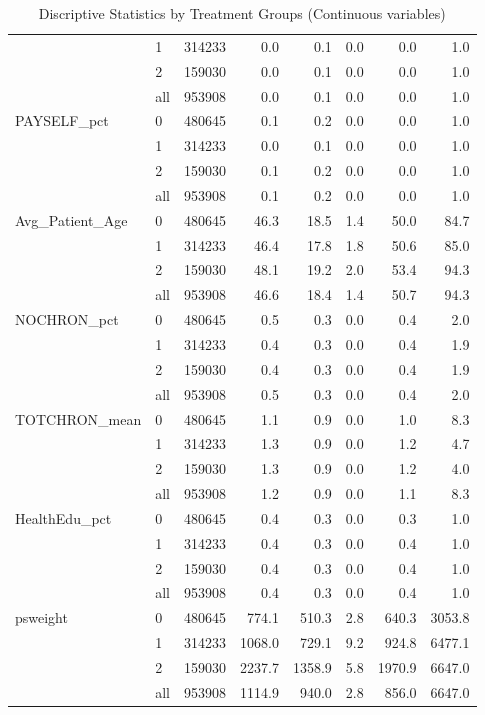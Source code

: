 \begin{table}[ht]
{\begin{tabular}{llrrrrrr}
   & 1 & 314233 &    0.0 &    0.1 & 0.0 &    0.0 &    1.0 \\ 
   & 2 & 159030 &    0.0 &    0.1 & 0.0 &    0.0 &    1.0 \\ 
   \hline
 & all & 953908 &    0.0 &    0.1 & 0.0 &    0.0 &    1.0 \\ 
   \hline
PAYSELF\_pct & 0 & 480645 &    0.1 &    0.2 & 0.0 &    0.0 &    1.0 \\ 
   & 1 & 314233 &    0.0 &    0.1 & 0.0 &    0.0 &    1.0 \\ 
   & 2 & 159030 &    0.1 &    0.2 & 0.0 &    0.0 &    1.0 \\ 
   \hline
 & all & 953908 &    0.1 &    0.2 & 0.0 &    0.0 &    1.0 \\ 
   \hline
Avg\_Patient\_Age & 0 & 480645 &   46.3 &   18.5 & 1.4 &   50.0 &   84.7 \\ 
   & 1 & 314233 &   46.4 &   17.8 & 1.8 &   50.6 &   85.0 \\ 
   & 2 & 159030 &   48.1 &   19.2 & 2.0 &   53.4 &   94.3 \\ 
   \hline
 & all & 953908 &   46.6 &   18.4 & 1.4 &   50.7 &   94.3 \\ 
   \hline
NOCHRON\_pct & 0 & 480645 &    0.5 &    0.3 & 0.0 &    0.4 &    2.0 \\ 
   & 1 & 314233 &    0.4 &    0.3 & 0.0 &    0.4 &    1.9 \\ 
   & 2 & 159030 &    0.4 &    0.3 & 0.0 &    0.4 &    1.9 \\ 
   \hline
 & all & 953908 &    0.5 &    0.3 & 0.0 &    0.4 &    2.0 \\ 
   \hline
TOTCHRON\_mean & 0 & 480645 &    1.1 &    0.9 & 0.0 &    1.0 &    8.3 \\ 
   & 1 & 314233 &    1.3 &    0.9 & 0.0 &    1.2 &    4.7 \\ 
   & 2 & 159030 &    1.3 &    0.9 & 0.0 &    1.2 &    4.0 \\ 
   \hline
 & all & 953908 &    1.2 &    0.9 & 0.0 &    1.1 &    8.3 \\ 
   \hline
HealthEdu\_pct & 0 & 480645 &    0.4 &    0.3 & 0.0 &    0.3 &    1.0 \\ 
   & 1 & 314233 &    0.4 &    0.3 & 0.0 &    0.4 &    1.0 \\ 
   & 2 & 159030 &    0.4 &    0.3 & 0.0 &    0.4 &    1.0 \\ 
   \hline
 & all & 953908 &    0.4 &    0.3 & 0.0 &    0.4 &    1.0 \\ 
   \hline
psweight & 0 & 480645 &  774.1 &  510.3 & 2.8 &  640.3 & 3053.8 \\ 
   & 1 & 314233 & 1068.0 &  729.1 & 9.2 &  924.8 & 6477.1 \\ 
   & 2 & 159030 & 2237.7 & 1358.9 & 5.8 & 1970.9 & 6647.0 \\ 
   \hline
 & all & 953908 & 1114.9 &  940.0 & 2.8 &  856.0 & 6647.0 \\ 
   \hline
\end{tabular}
}
\caption{Discriptive Statistics by Treatment Groups (Continuous variables)} 
\label{tab:descriptive.2}
\end{table}

